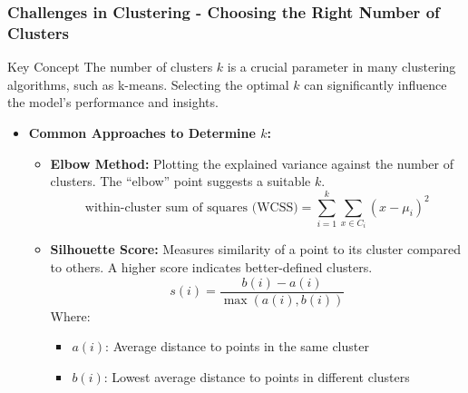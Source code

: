 \documentclass[aspectratio=169]{beamer}
\begin{document}
\begin{frame}[fragile]
  \frametitle{Challenges in Clustering - Choosing the Right Number of Clusters}
  \begin{block}{Key Concept}
    The number of clusters \(k\) is a crucial parameter in many clustering algorithms, such as k-means. Selecting the optimal \(k\) can significantly influence the model's performance and insights.
  \end{block}

  \begin{itemize}
    \item \textbf{Common Approaches to Determine \(k\):}
      \begin{itemize}
        \item \textbf{Elbow Method:} 
          Plotting the explained variance against the number of clusters. The “elbow” point suggests a suitable \(k\).
          \begin{equation}
          \text{within-cluster sum of squares (WCSS)} = \sum_{i=1}^{k} \sum_{x \in C_i} (x - \mu_i)^2
          \end{equation}
          
        \item \textbf{Silhouette Score:} 
          Measures similarity of a point to its cluster compared to others. A higher score indicates better-defined clusters.
          \begin{equation}
          s(i) = \frac{b(i) - a(i)}{\max(a(i), b(i))}
          \end{equation}
          Where:
          \begin{itemize}
            \item \(a(i)\): Average distance to points in the same cluster
            \item \(b(i)\): Lowest average distance to points in different clusters
          \end{itemize}
      \end{itemize}
  \end{itemize}
\end{frame}
\end{document}
